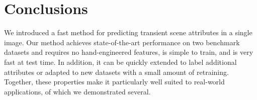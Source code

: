 \documentclass[10pt,twocolumn,letterpaper]{article}
\begin{document}
\section{Conclusions}

We introduced a fast method for predicting transient scene attributes
in a single image. Our method achieves state-of-the-art performance on
two benchmark datasets and requires no hand-engineered features, is
simple to train, and is very fast at test time. In addition, it can be
quickly extended to label additional attributes or adapted to new
datasets with a small amount of retraining. Together, these properties
make it particularly well suited to real-world applications, of which
we demonstrated several.


%

{\fontsize{8.5pt}{9.5pt}\selectfont


}
\end{document}
